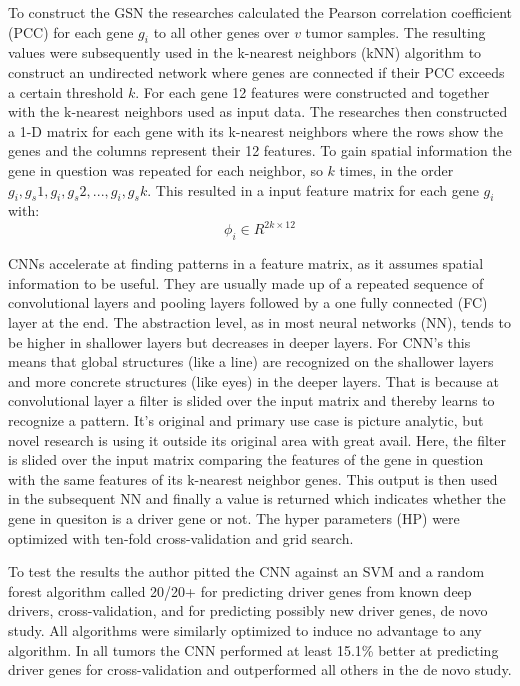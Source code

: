 \documentclass{article}
\begin{document}
To construct the GSN the researches calculated the Pearson correlation coefficient (PCC) for each gene $g_i$ to all other genes over $v$ tumor samples.
The resulting values were subsequently used in the k-nearest neighbors (kNN) algorithm to construct an undirected network where genes are connected if their PCC exceeds a certain threshold $k$. For each gene 12 features were constructed and together with the k-nearest neighbors used as input data. The researches then constructed a 1-D matrix for each gene with its k-nearest neighbors where the rows show the genes and the columns represent their 12 features. To gain spatial information the gene in question was repeated for each neighbor, so $k$ times, in the order $g_i, g_s1,g_i,g_s2, ... , g_i,g_sk$. This resulted in a input feature matrix for each gene $g_i$ with:
\begin{equation}
\phi_i \in R^{2k \times 12}
\end{equation}

CNNs accelerate at finding patterns in a feature matrix, as it assumes spatial information to be useful. They are usually made up of a repeated sequence of convolutional layers and pooling layers followed by a one fully connected (FC) layer at the end. The abstraction level, as in most neural networks (NN), tends to be higher in shallower layers but decreases in deeper layers. For CNN's this means that global structures (like a line) are recognized on the shallower layers and more concrete structures (like eyes) in the deeper layers. That is because at convolutional layer a filter is slided over the input matrix and thereby learns to recognize a pattern. It's original and primary use case is picture analytic, but novel research is using it outside its original area with great avail. Here, the filter is slided over the input matrix comparing the features of the gene in question with the same features of its k-nearest neighbor genes. This output is then used in the subsequent NN and finally a value is returned which indicates whether the gene in quesiton is a driver gene or not. The hyper parameters (HP) were optimized with ten-fold cross-validation and grid search.


To test the results the author pitted the CNN against an SVM and a random forest algorithm called 20/20+ for predicting driver genes from known deep drivers, cross-validation, and for predicting possibly new driver genes, de novo study. All algorithms were similarly optimized to induce no advantage to any algorithm. In all tumors the CNN performed at least 15.1\% better at predicting driver genes for cross-validation and outperformed all others in the de novo study. 
\end{document}
